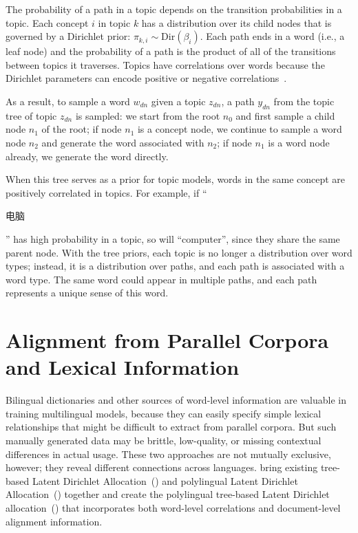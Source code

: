 The probability of a path in a topic depends on the transition
probabilities in a topic.  Each concept $i$ in topic $k$ has a
distribution over its child nodes that is governed by a Dirichlet prior:
$\pi_{k,i} \sim \text{Dir}(\beta_{i})$.  Each path ends in a word
(i.e., a leaf node) and the probability of a path is the product of
all of the transitions between topics it traverses. Topics have
correlations over words because the Dirichlet parameters can encode
positive or negative correlations~\citep{andrzejewski-09}.

As a result, to sample a word $w_{dn}$ given a topic $z_{dn}$, a path
$y_{dn}$ from the topic tree of topic $z_{dn}$ is sampled: we start
from the root $n_0$ and first sample a child node $n_1$ of the root;
if node $n_1$ is a concept node, we continue to sample a word node
$n_2$ and generate the word associated with $n_2$; if node $n_1$ is a
word node already, we generate the word directly.

When this tree serves as a prior for topic models, words in the same
concept are positively correlated in topics.  For example, if
``\begin{CJK*}{UTF8}{gbsn}电脑\end{CJK*}'' has high probability in a
  topic, so will ``computer'', since they share the same parent
  node. With the tree priors, each topic is no longer a distribution
  over word types; instead, it is a distribution over paths, and each
  path is associated with a word type.  The same word could appear in
  multiple paths, and each path represents a unique sense of this
  word.

\section{Alignment from Parallel Corpora and Lexical Information}

Bilingual dictionaries and other sources of word-level information are 
valuable in training multilingual models, because they can easily specify 
simple lexical relationships that might be difficult to extract from parallel corpora.
But such manually generated data may be brittle, low-quality, or missing contextual differences in actual usage.
These two approaches are not mutually exclusive, however; they reveal
different connections across languages. \citet{hu-14} bring existing
tree-based Latent Dirichlet Allocation~(\tlda{}) and polylingual Latent Dirichlet 
Allocation~(\plda{}) together and create the polylingual tree-based Latent Dirichlet 
allocation~(\ptlda{}) that incorporates both word-level correlations and
document-level alignment information.

